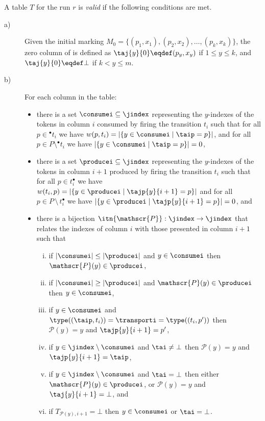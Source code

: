 \begin{definition} 
A table $T$ for the run $r$ is \emph{valid} if the following conditions
are met.
\begin{description}
\item[a)] Given the initial marking 
$M_0=\{(p_1,x_1),(p_2,x_2),\ldots,(p_k,x_k)\}$, 
the zero column of  is defined as
$\taj{y}{0}\eqdef(p_y,x_y)$ if $1\leq y \leq k$, and 
$\taj{y}{0}\eqdef\bot$ if $k <  y \leq m$.
\item[b)] For each column  in the table:
\begin{itemize}
\item there is a set $\consumei\subseteq \jindex$ representing 
the $y$-indexes of the tokens  in column $i$
consumed by firing the transition $t_i$ such that for all 
$p \in {^\bullet}t_i$ we have 
$w(p,t_i)=|\{y \in \consumei \mid \taip=p\}|$,
and for all $p \in P \setminus \!^\bullet{t_i}$ we have 
$|\{y \in \consumei \mid \taip=p\}|=0$, 
\item there is a set $\producei\subseteq \jindex$ representing
the $y$-indexes of the tokens in column $i+1$ produced by firing 
the transition $t_i$ such that for all 
$p \in t_i^\bullet$ we have 
$w(t_i,p)=|\{y \in \producei \mid \tajp{y}{i+1}=p\}|$ 
and for all $p \in P\,\setminus\, t_i^\bullet$ we have 
$|\{y \in \producei \mid \tajp{y}{i+1}=p\}|=0$, and
\item there is a bijection 
$\itn{\mathscr{P}}:\jindex\rightarrow\jindex$ that relates the indexes 
of column $i$ with 
those presented in column $i+1$ such that
\begin{enumerate}[i)]
\item if $|\consumei| \leq |\producei|$ and $y \in \consumei$ then $\mathscr{P}(y) \in \producei$,
\item if $|\consumei| \geq |\producei|$ and $\mathscr{P}(y) \in \producei$ then $y \in \consumei$,
\item if $y \in \consumei$ and 
$\type((\taip,t_i))=\transporti= \type((t_i,p'))$ 
then $\mathscr{P}(y)=y$ and $\tajp{y}{i+1}=p'$,
\item if $y \in \jindex \setminus \consumei$ and $\tai\neq\bot$ then $\mathscr{P}(y)=y$ and $\tajp{y}{i+1}=\taip$,
\item if  $y \in \jindex\setminus \consumei$ and $\tai=\bot$ then either $\mathscr{P}(y) \in \producei$, or $\mathscr{P}(y)=y$ and $\taj{y}{i+1}=\bot$, and

\item if $T_{\mathscr{P}(y),i+1}=\bot$ then $y \in \consumei$ or $\tai=\bot$.
\end{enumerate}
\end{itemize}


\end{description}
\end{definition}
